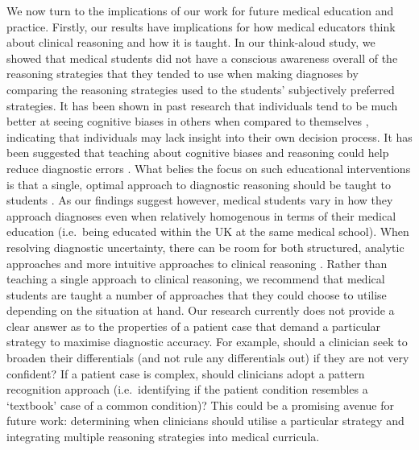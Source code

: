 \documentclass[a4paper, nobind]{templates/ociamthesis}
\begin{document}
We now turn to the implications of our work for future medical education and practice. Firstly, our results have implications for how medical educators think about clinical reasoning and how it is taught. In our think-aloud study, we showed that medical students did not have a conscious awareness overall of the reasoning strategies that they tended to use when making diagnoses by comparing the reasoning strategies used to the students' subjectively preferred strategies. It has been shown in past research that individuals tend to be much better at seeing cognitive biases in others when compared to themselves \autocite{pronin_bias_2002}, indicating that individuals may lack insight into their own decision process. It has been suggested that teaching about cognitive biases and reasoning could help reduce diagnostic errors \autocite{royce_teaching_2019}. What belies the focus on such educational interventions is that a single, optimal approach to diagnostic reasoning should be taught to students \autocite{kassirer_teaching_1983}. As our findings suggest however, medical students vary in how they approach diagnoses even when relatively homogenous in terms of their medical education (i.e.~being educated within the UK at the same medical school). When resolving diagnostic uncertainty, there can be room for both structured, analytic approaches and more intuitive approaches to clinical reasoning \autocite{custers_medical_2013}. Rather than teaching a single approach to clinical reasoning, we recommend that medical students are taught a number of approaches that they could choose to utilise depending on the situation at hand. Our research currently does not provide a clear answer as to the properties of a patient case that demand a particular strategy to maximise diagnostic accuracy. For example, should a clinician seek to broaden their differentials (and not rule any differentials out) if they are not very confident? If a patient case is complex, should clinicians adopt a pattern recognition approach (i.e.~identifying if the patient condition resembles a `textbook' case of a common condition)? This could be a promising avenue for future work: determining when clinicians should utilise a particular strategy and integrating multiple reasoning strategies into medical curricula.\\
\end{document}
